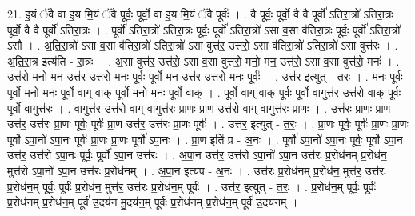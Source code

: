 \documentclass[17pt]{extarticle}
\begin{document}
21. इ॒यं ॅवै वा इ॒य मि॒यं ॅवै पूर्वः॒ पूर्वो॒ वा इ॒य मि॒यं ॅवै पूर्वः॑ । . वै पूर्वः॒ पूर्वो॒ वै वै पूर्वो॑ ऽतिरा॒त्रो॑ ऽतिरा॒त्रः पूर्वो॒ वै वै पूर्वो॑ ऽतिरा॒त्रः । . पूर्वो॑ ऽतिरा॒त्रो॑ ऽतिरा॒त्रः पूर्वः॒ पूर्वो॑ ऽतिरा॒त्रो॑ ऽसा व॒सा व॑तिरा॒त्रः पूर्वः॒ पूर्वो॑ ऽतिरा॒त्रो॑ ऽसौ । . अ॒ति॒रा॒त्रो॑ ऽसा व॒सा व॑तिरा॒त्रो॑ ऽतिरा॒त्रो॑ ऽसा वुत्त॑र॒ उत्त॑रो॒ ऽसा व॑तिरा॒त्रो॑ ऽतिरा॒त्रो॑ ऽसा वुत्त॑रः । . अ॒ति॒रा॒त्र इत्य॑ति - रा॒त्रः । . अ॒सा वुत्त॑र॒ उत्त॑रो॒ ऽसा व॒सा वुत्त॑रो॒ मनो॒ मन॒ उत्त॑रो॒ ऽसा व॒सा वुत्त॑रो॒ मनः॑ । . उत्त॑रो॒ मनो॒ मन॒ उत्त॑र॒ उत्त॑रो॒ मनः॒ पूर्वः॒ पूर्वो॒ मन॒ उत्त॑र॒ उत्त॑रो॒ मनः॒ पूर्वः॑ । . उत्त॑र॒ इत्युत् - त॒रः॒ । . मनः॒ पूर्वः॒ पूर्वो॒ मनो॒ मनः॒ पूर्वो॒ वाग् वाक् पूर्वो॒ मनो॒ मनः॒ पूर्वो॒ वाक् । . पूर्वो॒ वाग् वाक् पूर्वः॒ पूर्वो॒ वागुत्त॑र॒ उत्त॑रो॒ वाक् पूर्वः॒ पूर्वो॒ वागुत्त॑रः । . वागुत्त॑र॒ उत्त॑रो॒ वाग् वागुत्त॑रः प्रा॒णः प्रा॒ण उत्त॑रो॒ वाग् वागुत्त॑रः प्रा॒णः । . उत्त॑रः प्रा॒णः प्रा॒ण उत्त॑र॒ उत्त॑रः प्रा॒णः पूर्वः॒ पूर्वः॑ प्रा॒ण उत्त॑र॒ उत्त॑रः प्रा॒णः पूर्वः॑ । . उत्त॑र॒ इत्युत् - त॒रः॒ । . प्रा॒णः पूर्वः॒ पूर्वः॑ प्रा॒णः प्रा॒णः पूर्वो॑ ऽपा॒नो॑ ऽपा॒नः पूर्वः॑ प्रा॒णः प्रा॒णः पूर्वो॑ ऽपा॒नः । . प्रा॒ण इति॑ प्र - अ॒नः । . पूर्वो॑ ऽपा॒नो॑ ऽपा॒नः पूर्वः॒ पूर्वो॑ ऽपा॒न उत्त॑र॒ उत्त॑रो ऽपा॒नः पूर्वः॒ पूर्वो॑ ऽपा॒न उत्त॑रः । . अ॒पा॒न उत्त॑र॒ उत्त॑रो ऽपा॒नो॑ ऽपा॒न उत्त॑रः प्र॒रोध॑नम् प्र॒रोध॑न॒ मुत्त॑रो ऽपा॒नो॑ ऽपा॒न उत्त॑रः प्र॒रोध॑नम् । . अ॒पा॒न इत्य॑प - अ॒नः । . उत्त॑रः प्र॒रोध॑नम् प्र॒रोध॑न॒ मुत्त॑र॒ उत्त॑रः प्र॒रोध॑न॒म् पूर्वः॒ पूर्वः॑ प्र॒रोध॑न॒ मुत्त॑र॒ उत्त॑रः प्र॒रोध॑न॒म् पूर्वः॑ । . उत्त॑र॒ इत्युत् - त॒रः॒ । . प्र॒रोध॑न॒म् पूर्वः॒ पूर्वः॑ प्र॒रोध॑नम् प्र॒रोध॑न॒म् पूर्व॑ उ॒दय॑न मु॒दय॑न॒म् पूर्वः॑ प्र॒रोध॑नम् प्र॒रोध॑न॒म् पूर्व॑ उ॒दय॑नम् । \newline
\end{document}
